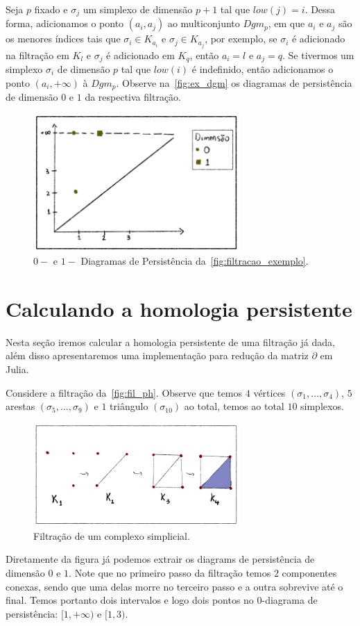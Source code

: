 Seja $p$ fixado e $\sigma_j$ um simplexo de dimensão $p+1$ tal que $low(j)=i$.
Dessa forma, adicionamos o ponto $(a_i, a_j)$ ao multiconjunto $Dgm_p$, em que
$a_i$ e $a_j$ são os menores índices tais que $\sigma_i \in K_{a_i}$ e $\sigma_j
\in K_{a_j}$, por exemplo, se $\sigma_i$ é adicionado na filtração em $K_l$ e
$\sigma_j$ é adicionado em $K_q$, então $a_i = l$ e $a_j = q$. Se tivermos um
simplexo $\sigma_i$ de dimensão $p$ tal que $low(i)$ é indefinido, então
adicionamos o ponto $(a_i, +\infty)$ à $Dgm_p$. Observe na~\autoref{fig:ex_dgm}
os diagramas de persistência de dimensão $0$ e $1$ da respectiva filtração.
\begin{figure}[!htpb]
  \centering
  \includegraphics[width=0.7\textwidth]{images/ex_dgm.png}
  \caption{$0-$ e $1-$ Diagramas de Persistência da~\autoref{fig:filtracao_exemplo}.}
  \label{fig:ex_dgm}
  \fautor
\end{figure}

\section{Calculando a homologia persistente}
Nesta seção iremos calcular a homologia persistente de uma filtração já dada,
além disso apresentaremos uma implementação para redução da matriz $\partial$
em Julia.

Considere a filtração da~\autoref{fig:fil_ph}. Observe que temos $4$ vértices
$(\sigma_1,\dots,\sigma_4)$, $5$ arestas $(\sigma_5,\dots,\sigma_9)$
e $1$ triângulo $(\sigma_{10})$ ao total, temos ao total $10$ simplexos.
\begin{figure}[bht]
  \centering
  \includegraphics[width=0.7\textwidth]{images/fil_ph.png}
  \caption{Filtração de um complexo simplicial.}
  \label{fig:fil_ph}
  \fautor
\end{figure}
Diretamente da figura já podemos extrair os diagrams de persistência de dimensão
$0$ e $1$. Note que no primeiro passo da filtração temos $2$ componentes conexas,
sendo que uma delas morre no terceiro passo e a outra sobrevive até o final.
Temos portanto dois intervalos e logo dois  pontos no $0$-diagrama de persistência:
$[1,+\infty)$ e $[1,3)$.

